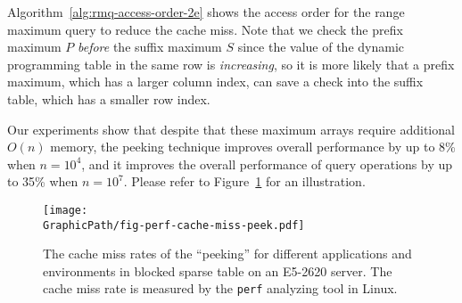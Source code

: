 Algorithm~\ref{alg:rmq-access-order-2e} shows the access order for the
range maximum query to reduce the cache miss.  Note that we check the
prefix maximum $P$ {\em before} the suffix maximum $S$ since the value
of the dynamic programming table in the same row is {\em increasing},
so it is more likely that a prefix maximum, which has a larger column
index, can save a check into the suffix table, which has a smaller row
index.

Our experiments show that despite that these maximum arrays require
additional $O(n)$ memory, the peeking technique improves overall
performance by up to 8\% when $n = 10^4$, and it improves the overall
performance of query operations by up to 35\% when $n = 10^7$.  Please
refer to Figure~\ref{fig:fig-perf-cache-miss-peek} for an
illustration.

\begin{figure}
  \centering
  \texttt{[image: \\GraphicPath/fig-perf-cache-miss-peek.pdf]}
  \caption{The cache miss rates of the ``peeking'' for different
    applications and environments in blocked sparse table on an
    E5-2620 server.  The cache miss rate is measured by the {\tt perf}
    analyzing tool in Linux.}
  \label{fig:fig-perf-cache-miss-peek}
\end{figure}




